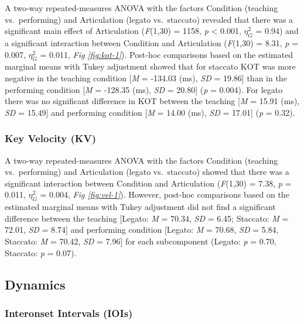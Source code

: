 \documentclass[
  english,
  man,floatsintext]{apa6}
\begin{document}
A two-way repeated-measures ANOVA with the factors Condition (teaching vs.~performing) and Articulation (legato vs.~staccato) revealed that there was a significant main effect of Articulation (\emph{F}(1,30) = 1158, \emph{p} \textless{} 0.001, \(\eta_G^2\) = 0.94) and a significant interaction between Condition and Articulation (\emph{F}(1,30) = 8.31, \emph{p} = 0.007, \(\eta_G^2\) = 0.011, \emph{Fig \ref{fig:kot-1}}). Post-hoc comparisons based on the estimated marginal means with Tukey adjustment showed that for staccato KOT was more negative in the teaching condition {[}\emph{M} = -134.03 (ms), \emph{SD} = 19.86{]} than in the performing condition {[}\emph{M} = -128.35 (ms), \emph{SD} = 20.80{]} (\emph{p} = 0.004). For legato there was no significant difference in KOT between the teaching {[}\emph{M} = 15.91 (ms), \emph{SD} = 15.49{]} and performing condition {[}\emph{M} = 14.00 (ms), \emph{SD} = 17.01{]} (\emph{p} = 0.32).

\hypertarget{key-velocity-kv}{%
\subsubsection{Key Velocity (KV)}\label{key-velocity-kv}}

A two-way repeated-measures ANOVA with the factors Condition (teaching vs.~performing) and Articulation (legato vs.~staccato) showed that there was a significant interaction between Condition and Articulation (\emph{F}(1,30) = 7.38, \emph{p} = 0.011, \(\eta_G^2\) = 0.004, \emph{Fig \ref{fig:vel-1}}). However, post-hoc comparisons based on the estimated marginal means with Tukey adjustment did not find a significant difference between the teaching {[}Legato: \emph{M} = 70.34, \emph{SD} = 6.45; Staccato: \emph{M} = 72.01, \emph{SD} = 8.74{]} and performing condition {[}Legato: \emph{M} = 70.68, \emph{SD} = 5.84, Staccato: \emph{M} = 70.42, \emph{SD} = 7.96{]} for each subcomponent (Legato: \emph{p} = 0.70, Staccato: \emph{p} = 0.07).

\hypertarget{dynamics}{%
\subsection{Dynamics}\label{dynamics}}

\hypertarget{interonset-intervals-iois-1}{%
\subsubsection{Interonset Intervals (IOIs)}\label{interonset-intervals-iois-1}}
\end{document}
